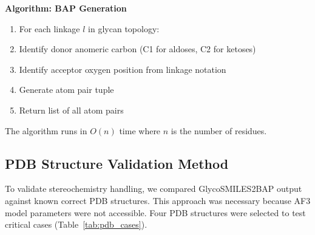 \documentclass[11pt,a4paper]{article}
\begin{document}
\noindent\textbf{Algorithm: BAP Generation}
\begin{enumerate}
\item For each linkage $l$ in glycan topology:
\item \quad Identify donor anomeric carbon (C1 for aldoses, C2 for ketoses)
\item \quad Identify acceptor oxygen position from linkage notation
\item \quad Generate atom pair tuple
\item Return list of all atom pairs
\end{enumerate}

\noindent The algorithm runs in $O(n)$ time where $n$ is the number of residues.

\subsection{PDB Structure Validation Method}

To validate stereochemistry handling, we compared GlycoSMILES2BAP output against known correct PDB structures. This approach was necessary because AF3 model parameters were not accessible. Four PDB structures were selected to test critical cases (Table~\ref{tab:pdb_cases}).
\end{document}
